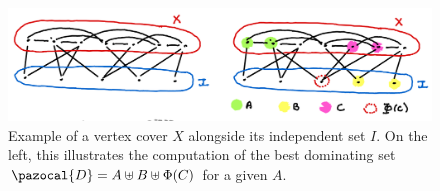 \begin{figure}
    \includegraphics[width=\textwidth]{figures/domset-vc.png}
    \caption{Example of a vertex cover $X$ alongside its independent set $I$. On the left, this illustrates the computation of the best dominating set $\pazocal{D} = A \uplus B \uplus \Phi(C)$ for a given $A$.}
    \label{fig:domset-vc}
\end{figure}